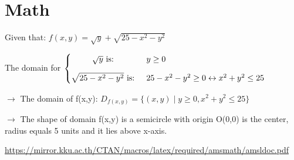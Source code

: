 \clearpage
\section{Math}

\begin{tcolorbox}
    Given that: $f(x,y) = \sqrt{y} + \sqrt{25 - x^2 - y^2}$

    The domain for
    $
    \begin{cases}
        \hfill
        \sqrt{y} \text{ is: } & y \geq 0
        \hfill
        \vspace{3mm} \\
        \hfill
        \sqrt{25 - x^2 - y^2} \text{ is: } & 25 - x^2 - y^2 \geq 0 \leftrightarrow x^2 + y^2 \leq 25
        \hfill
    \end{cases}
    $

    $\rightarrow$ The domain of f(x,y): $D_{f(x,y)} = \{(x,y) \mid  y \geq 0 , x^2 + y^2 \leq 25 \}$

    $\rightarrow$ The shape of domain f(x,y) is a semicircle with origin O(0,0) is the center, radius equals 5 units and it lies above x-axis.
\end{tcolorbox}

\url{https://mirror.kku.ac.th/CTAN/macros/latex/required/amsmath/amsldoc.pdf}

